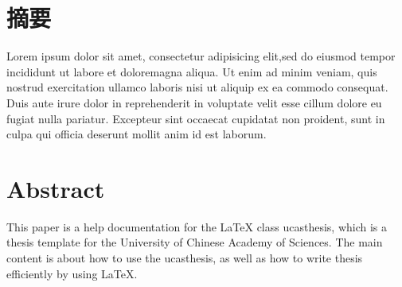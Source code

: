 \makedeclaration%
\intobmk\chapter*{摘要}%
\setcounter{page}{1}%



Lorem ipsum dolor sit amet, consectetur adipisicing elit,sed do eiusmod tempor incididunt ut labore et doloremagna aliqua.
Ut enim ad minim veniam, quis nostrud exercitation ullamco laboris nisi ut aliquip ex ea commodo consequat.
Duis aute irure dolor in reprehenderit in voluptate velit esse cillum dolore eu fugiat nulla pariatur.
Excepteur sint occaecat cupidatat non proident, sunt in culpa qui officia deserunt mollit anim id est laborum.

\intobmk\chapter*{Abstract}%

This paper is a help documentation for the \LaTeX{} class ucasthesis, which is  a thesis template for the University of Chinese Academy of Sciences. The main content is about how to use the ucasthesis, as well as how to write thesis efficiently by using \LaTeX{}.


